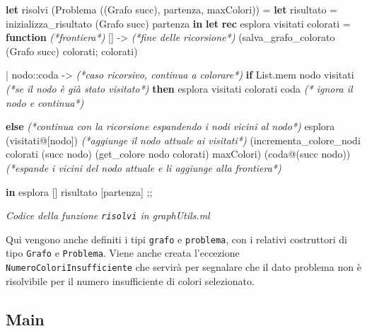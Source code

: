 \documentclass[11pt]{article}
\newenvironment{Shaded}{}{}
\newcommand{\KeywordTok}[1]{\textcolor[rgb]{0.00,0.44,0.13}{\textbf{{#1}}}}
\newcommand{\DataTypeTok}[1]{\textcolor[rgb]{0.56,0.13,0.00}{{#1}}}
\newcommand{\CommentTok}[1]{\textcolor[rgb]{0.38,0.63,0.69}{\textit{{#1}}}}
\newcommand{\NormalTok}[1]{{#1}}
\begin{document}
    \begin{Shaded}
\begin{Highlighting}[]
\KeywordTok{let}\NormalTok{ risolvi (Problema ((Grafo }\DataTypeTok{succ}\NormalTok{), partenza, maxColori)) =}
  \KeywordTok{let}\NormalTok{ risultato = inizializza\_risultato (Grafo }\DataTypeTok{succ}\NormalTok{) partenza }\KeywordTok{in}  
  \KeywordTok{let} \KeywordTok{rec}\NormalTok{ esplora visitati colorati = }
    \KeywordTok{function} \CommentTok{(*frontiera*)}
\NormalTok{        []            {-}\textgreater{}          }\CommentTok{(*fine delle ricorsione*)}
\NormalTok{          (salva\_grafo\_colorato (Grafo }\DataTypeTok{succ}\NormalTok{) colorati; colorati)}

\NormalTok{      | nodo::coda    {-}\textgreater{}           }\CommentTok{(*caso ricorsivo, continua a colorare*)}
        \KeywordTok{if} \DataTypeTok{List}\NormalTok{.mem nodo visitati              }\CommentTok{(*se il nodo è già stato visitato*)}
          \KeywordTok{then}\NormalTok{ esplora visitati colorati coda     }\CommentTok{(* ignora il nodo e continua*)}
        
        \KeywordTok{else} 
          \CommentTok{(*continua con la ricorsione espandendo i nodi vicini al nodo*)}
\NormalTok{          esplora }
\NormalTok{                (visitati@[nodo])      }\CommentTok{(*aggiunge il nodo attuale ai visitati*)}
\NormalTok{                (incrementa\_colore\_nodi } 
\NormalTok{                     colorati} 
\NormalTok{                     (}\DataTypeTok{succ}\NormalTok{ nodo)}
\NormalTok{                     (get\_colore nodo colorati) maxColori) }
\NormalTok{                (coda@(}\DataTypeTok{succ}\NormalTok{ nodo))     }
\CommentTok{                (*espande i vicini del nodo attuale e li aggiunge alla frontiera*)}
      
  \KeywordTok{in}\NormalTok{ esplora [] risultato [partenza]}
\NormalTok{;;}
\end{Highlighting}
\end{Shaded}

\emph{Codice della funzione \texttt{risolvi} in graphUtils.ml}

    Qui vengono anche definiti i tipi \texttt{grafo} e \texttt{problema},
con i relativi costruttori di tipo \texttt{Grafo} e \texttt{Problema}.
Viene anche creata l'eccezione \texttt{NumeroColoriInsufficiente} che
servirà per segnalare che il dato problema non è risolvibile per il
numero insufficiente di colori selezionato.

    \hypertarget{main}{%
\subsection{\texorpdfstring{Main }{Main }}\label{main}}
\end{document}
